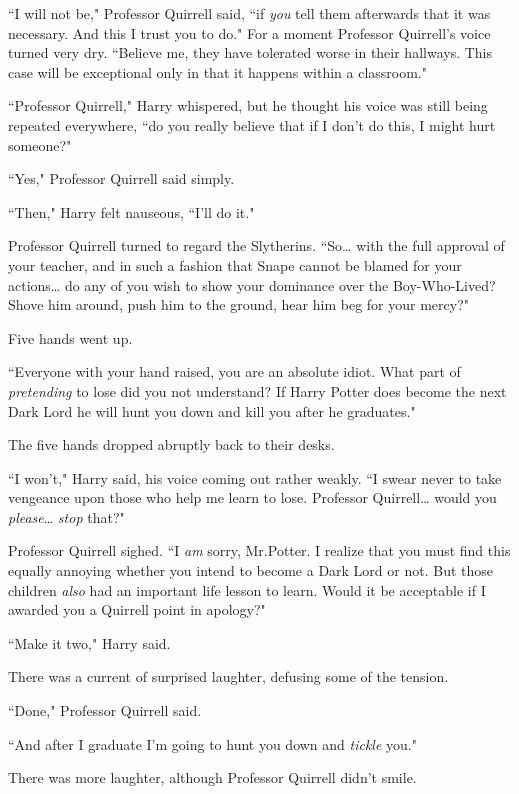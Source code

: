 ``I will not be," Professor Quirrell said, ``if \emph{you} tell them afterwards that it was necessary. And this I trust you to do." For a moment Professor Quirrell's voice turned very dry. ``Believe me, they have tolerated worse in their hallways. This case will be exceptional only in that it happens within a classroom."

``Professor Quirrell," Harry whispered, but he thought his voice was still being repeated everywhere, ``do you really believe that if I don't do this, I might hurt someone?"

``Yes," Professor Quirrell said simply.

``Then," Harry felt nauseous, ``I'll do it."

Professor Quirrell turned to regard the Slytherins. ``So{\ldots} with the full approval of your teacher, and in such a fashion that Snape cannot be blamed for your actions{\ldots} do any of you wish to show your dominance over the Boy-Who-Lived? Shove him around, push him to the ground, hear him beg for your mercy?"

Five hands went up.

``Everyone with your hand raised, you are an absolute idiot. What part of \emph{pretending} to lose did you not understand? If Harry Potter does become the next Dark Lord he will hunt you down and kill you after he graduates."

The five hands dropped abruptly back to their desks.

``I won't," Harry said, his voice coming out rather weakly. ``I swear never to take vengeance upon those who help me learn to lose. Professor Quirrell{\ldots} would you \emph{please}{\ldots} \emph{stop} that?"

Professor Quirrell sighed. ``I \emph{am} sorry, Mr.\?Potter. I realize that you must find this equally annoying whether you intend to become a Dark Lord or not. But those children \emph{also} had an important life lesson to learn. Would it be acceptable if I awarded you a Quirrell point in apology?"

``Make it two," Harry said.

There was a current of surprised laughter, defusing some of the tension.

``Done," Professor Quirrell said.

``And after I graduate I'm going to hunt you down and \emph{tickle} you."

There was more laughter, although Professor Quirrell didn't smile.

